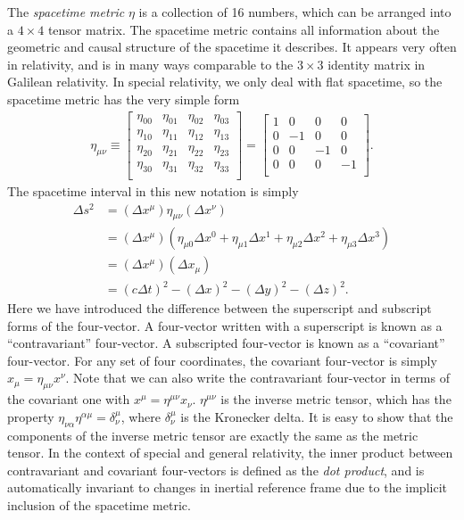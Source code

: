 \documentclass[titlepage,letterpaper,onecolumn,11pt,final]{report}
\numberwithin{equation}{section}
\numberwithin{figure}{section}
\begin{document}
The \emph{spacetime metric} $\eta$ is a collection of 16 numbers, which can be arranged into a $4 \times 4 $ tensor matrix. The spacetime metric contains all information about the geometric and causal structure of the spacetime it describes. It appears very often in relativity, and is in many ways comparable to the $3 \times 3$ identity matrix in Galilean relativity. In special relativity, we only deal with flat spacetime, so the spacetime metric has the very simple form
\begin{gather}
	\eta_{\mu \nu} \equiv
	\begin{bmatrix}
		\eta_{0 0} & \eta_{0 1}  & \eta_{0 2}  & \eta_{0 3} \\
		\eta_{1 0} & \eta_{1 1}  & \eta_{1 2}  & \eta_{1 3} \\
		\eta_{2 0} & \eta_{2 1}  & \eta_{2 2}  & \eta_{2 3} \\
		\eta_{3 0} & \eta_{3 1}  & \eta_{3 2}  & \eta_{3 3} \\
	\end{bmatrix}
	=
	\begin{bmatrix}
		1 & 0  & 0  & 0 \\
		0 & -1 & 0  & 0 \\
		0 & 0  & -1 & 0 \\
		0 & 0  & 0  & -1 \\
	\end{bmatrix}
	.
\end{gather}
%
The spacetime interval in this new notation is simply
\begin{equation}
\begin{split}
	\label{eq:spacetime_condensed}
	\Delta s^{2} &= (\Delta x^{\mu}) \eta_{\mu \nu} (\Delta x^{\nu}) \\
	&= (\Delta x^{\mu}) \left( \eta_{\mu 0} \Delta x^{0} + \eta_{\mu 1} \Delta x^{1} + \eta_{\mu 2} \Delta x^{2} + \eta_{\mu 3} \Delta x^{3} \right) \\
	&= (\Delta x^{\mu}) \left( \Delta x_{\mu} \right) \\
	&= (c \Delta t)^{2} - (\Delta x)^{2} - (\Delta y)^{2} - (\Delta z)^{2}.
\end{split}
\end{equation}
%
Here we have introduced the difference between the superscript and subscript forms of the four-vector. A four-vector written with a superscript is known as a ``contravariant'' four-vector. A subscripted four-vector is known as a ``covariant'' four-vector. For any set of four coordinates, the covariant four-vector is simply $x_{\mu} = \eta_{\mu \nu} x^{\nu}$. Note that we can also write the contravariant four-vector in terms of the covariant one with $x^{\mu} = \eta^{\mu \nu} x_{\nu}$. $\eta^{\mu \nu}$ is the inverse metric tensor, which has the property $\eta_{\nu \alpha} \eta^{\alpha \mu} = \delta^{\mu}_{\nu}$, where $\delta^{\mu}_{\nu}$ is the Kronecker delta. It is easy to show that the components of the inverse metric tensor are exactly the same as the metric tensor. In the context of special and general relativity, the inner product between contravariant and covariant four-vectors is defined as the \emph{dot product}, and is automatically invariant to changes in inertial reference frame due to the implicit inclusion of the spacetime metric.
\end{document}

